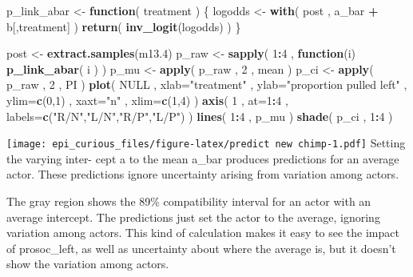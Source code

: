 \documentclass[
]{article}
\newenvironment{Shaded}{\begin{snugshade}}{\end{snugshade}}
\newcommand{\ControlFlowTok}[1]{\textcolor[rgb]{0.13,0.29,0.53}{\textbf{#1}}}
\newcommand{\DataTypeTok}[1]{\textcolor[rgb]{0.13,0.29,0.53}{#1}}
\newcommand{\DecValTok}[1]{\textcolor[rgb]{0.00,0.00,0.81}{#1}}
\newcommand{\FloatTok}[1]{\textcolor[rgb]{0.00,0.00,0.81}{#1}}
\newcommand{\KeywordTok}[1]{\textcolor[rgb]{0.13,0.29,0.53}{\textbf{#1}}}
\newcommand{\NormalTok}[1]{#1}
\newcommand{\OperatorTok}[1]{\textcolor[rgb]{0.81,0.36,0.00}{\textbf{#1}}}
\newcommand{\OtherTok}[1]{\textcolor[rgb]{0.56,0.35,0.01}{#1}}
\newcommand{\StringTok}[1]{\textcolor[rgb]{0.31,0.60,0.02}{#1}}
\begin{document}
\begin{Shaded}
\begin{Highlighting}[]
\NormalTok{p_link_abar <-}\StringTok{ }\ControlFlowTok{function}\NormalTok{( treatment ) \{}
\NormalTok{logodds <-}\StringTok{ }\KeywordTok{with}\NormalTok{( post , a_bar }\OperatorTok{+}\StringTok{ }\NormalTok{b[,treatment] ) }
\KeywordTok{return}\NormalTok{( }\KeywordTok{inv_logit}\NormalTok{(logodds) )}
\NormalTok{\}}

\NormalTok{post <-}\StringTok{ }\KeywordTok{extract.samples}\NormalTok{(m13}\FloatTok{.4}\NormalTok{)}
\NormalTok{p_raw <-}\StringTok{ }\KeywordTok{sapply}\NormalTok{( }\DecValTok{1}\OperatorTok{:}\DecValTok{4}\NormalTok{ , }\ControlFlowTok{function}\NormalTok{(i) }\KeywordTok{p_link_abar}\NormalTok{( i ) ) }
\NormalTok{p_mu <-}\StringTok{ }\KeywordTok{apply}\NormalTok{( p_raw , }\DecValTok{2}\NormalTok{ , mean )}
\NormalTok{p_ci <-}\StringTok{ }\KeywordTok{apply}\NormalTok{( p_raw , }\DecValTok{2}\NormalTok{ , PI )}
\KeywordTok{plot}\NormalTok{( }\OtherTok{NULL}\NormalTok{ , }\DataTypeTok{xlab=}\StringTok{"treatment"}\NormalTok{ , }\DataTypeTok{ylab=}\StringTok{"proportion pulled left"}\NormalTok{ ,}
    \DataTypeTok{ylim=}\KeywordTok{c}\NormalTok{(}\DecValTok{0}\NormalTok{,}\DecValTok{1}\NormalTok{) , }\DataTypeTok{xaxt=}\StringTok{"n"}\NormalTok{ , }\DataTypeTok{xlim=}\KeywordTok{c}\NormalTok{(}\DecValTok{1}\NormalTok{,}\DecValTok{4}\NormalTok{) )}
\KeywordTok{axis}\NormalTok{( }\DecValTok{1}\NormalTok{ , }\DataTypeTok{at=}\DecValTok{1}\OperatorTok{:}\DecValTok{4}\NormalTok{ , }\DataTypeTok{labels=}\KeywordTok{c}\NormalTok{(}\StringTok{"R/N"}\NormalTok{,}\StringTok{"L/N"}\NormalTok{,}\StringTok{"R/P"}\NormalTok{,}\StringTok{"L/P"}\NormalTok{) )}
\KeywordTok{lines}\NormalTok{( }\DecValTok{1}\OperatorTok{:}\DecValTok{4}\NormalTok{ , p_mu )}
\KeywordTok{shade}\NormalTok{( p_ci , }\DecValTok{1}\OperatorTok{:}\DecValTok{4}\NormalTok{ )}
\end{Highlighting}
\end{Shaded}

\texttt{[image: epi\_curious\_files/figure-latex/predict new chimp-1.pdf]}
Setting the varying inter- cept a to the mean a\_bar produces
predictions for an average actor. These predictions ignore uncertainty
arising from variation among actors.

The gray region shows the 89\% compatibility interval for an actor with
an average intercept. The predictions just set the actor to the average,
ignoring variation among actors. This kind of calculation makes it easy
to see the impact of prosoc\_left, as well as uncertainty about where
the average is, but it doesn't show the variation among actors.
\end{document}
